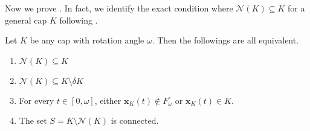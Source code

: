Now we prove . In fact, we identify the exact condition where \(\mathcal{N}(K) \subseteq K\) for a general cap \(K\) following .

\begin{theorem}

Let \(K\) be any cap with rotation angle \(\omega\). Then the followings are all equivalent.

\begin{enumerate}
\def\labelenumi{\arabic{enumi}.}
\tightlist
\item
  \(\mathcal{N}(K) \subseteq K\)
\item
  \(\mathcal{N}(K) \subseteq K \setminus \delta K\)
\item
  For every \(t \in [0, \omega]\), either \(\mathbf{x}_K(t) \not\in F_\omega^\circ\) or \(\mathbf{x}_K(t) \in K\).
\item
  The set \(S = K \setminus \mathcal{N}(K)\) is connected.
\end{enumerate}

\label{thm:monotonization-connected-iff}
\end{theorem}

